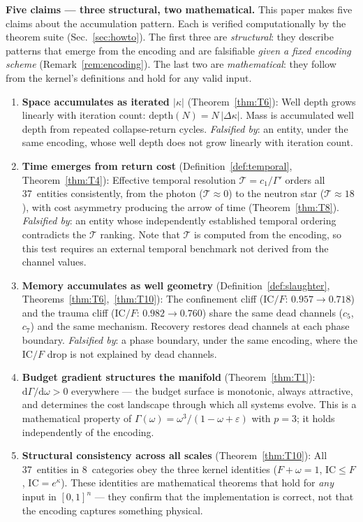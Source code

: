 \documentclass[
  aps,
  prd,
  twocolumn,
  superscriptaddress,
  nofootinbib,
  floatfix
]{revtex4-2}
\newcommand{\Gam}{\Gamma}
\newcommand{\eps}{\varepsilon}
\newcommand{\dd}{\mathrm{d}}
\newcommand{\IC}{\mathrm{IC}}
\begin{document}
\textbf{Five claims --- three structural, two mathematical.}
This paper makes five claims about the accumulation pattern.
Each is verified computationally by the theorem suite
(Sec.~\ref{sec:howto}).  The first three are
\emph{structural}: they describe patterns that emerge from
the encoding and are falsifiable \emph{given a fixed
encoding scheme} (Remark~\ref{rem:encoding}).  The last two
are \emph{mathematical}: they follow from the kernel's
definitions and hold for any valid input.
\begin{enumerate}
\item \textbf{Space accumulates as iterated $|\kappa|$}
  (Theorem~\ref{thm:T6}):
  Well depth grows linearly with iteration count:
  $\mathrm{depth}(N) = N\,|\Delta\kappa|$.  Mass is
  accumulated well depth from repeated collapse-return
  cycles.
  \emph{Falsified by}: an entity, under the same encoding,
  whose well depth does not grow linearly with iteration
  count.
\item \textbf{Time emerges from return cost}
  (Definition~\ref{def:temporal}, Theorem~\ref{thm:T4}):
  Effective temporal resolution $\mathcal{T} = c_1/\Gam'$
  orders all 37~entities consistently, from the photon
  ($\mathcal{T} \approx 0$) to the neutron star ($\mathcal{T}
  \approx 18$), with cost asymmetry producing the arrow of
  time (Theorem~\ref{thm:T8}).
  \emph{Falsified by}: an entity whose independently
  established temporal ordering contradicts the
  $\mathcal{T}$ ranking.  Note that $\mathcal{T}$ is computed
  from the encoding, so this test requires an external
  temporal benchmark not derived from the channel values.
\item \textbf{Memory accumulates as well geometry}
  (Definition~\ref{def:slaughter},
  Theorems~\ref{thm:T6},~\ref{thm:T10}):
  The confinement cliff ($\IC/F$: $0.957 \to 0.718$) and
  the trauma cliff ($\IC/F$: $0.982 \to 0.760$) share the
  same dead channels ($c_5$, $c_7$) and the same mechanism.
  Recovery restores dead channels at each phase boundary.
  \emph{Falsified by}: a phase boundary, under the same
  encoding, where the $\IC/F$ drop is not explained by
  dead channels.
\item \textbf{Budget gradient structures the manifold}
  (Theorem~\ref{thm:T1}):
  $\dd\Gam/\dd\omega > 0$ everywhere --- the budget surface
  is monotonic, always attractive, and determines the cost
  landscape through which all systems evolve.
  This is a mathematical property of $\Gam(\omega) =
  \omega^3/(1 - \omega + \eps)$ with $p = 3$; it holds
  independently of the encoding.
\item \textbf{Structural consistency across all scales}
  (Theorem~\ref{thm:T10}):
  All 37~entities in 8~categories obey the three kernel
  identities ($F + \omega = 1$, $\IC \leq F$,
  $\IC = e^{\kappa}$).  These identities are mathematical
  theorems that hold for \emph{any} input in $[0,1]^n$ ---
  they confirm that the implementation is correct, not that
  the encoding captures something physical.
\end{enumerate}
\end{document}
